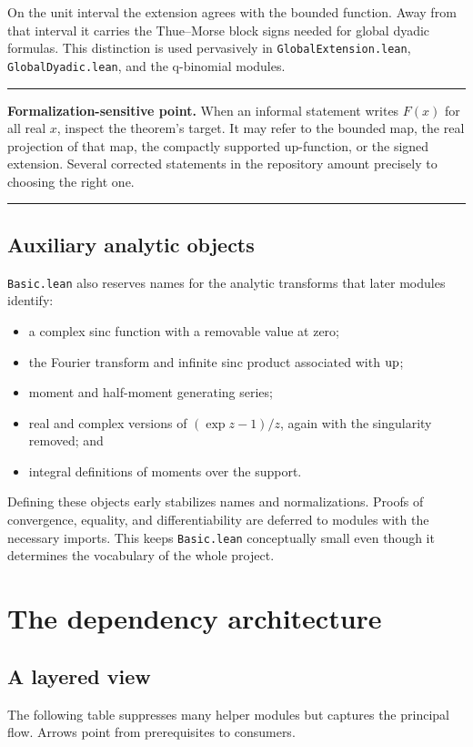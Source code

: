 \documentclass[11pt,oneside]{article}
\theoremstyle{definition}
\theoremstyle{remark}
\newenvironment{boxedremark}{%
  \par\smallskip\noindent\begin{center}\begin{minipage}{0.94\textwidth}%
  \color{black}\hrule\vspace{0.6em}\small
}{%
  \vspace{0.6em}\hrule\end{minipage}\end{center}\smallskip
}
\begin{document}
On the unit interval the extension agrees with the bounded function.  Away from that interval it carries the Thue--Morse block signs needed for global dyadic formulas.  This distinction is used pervasively in \nolinkurl{GlobalExtension.lean}, \nolinkurl{GlobalDyadic.lean}, and the q-binomial modules.

\begin{boxedremark}\textbf{Formalization-sensitive point.}\space
When an informal statement writes \(F(x)\) for all real \(x\), inspect the theorem's target.  It may refer to the bounded map, the real projection of that map, the compactly supported up-function, or the signed extension.  Several corrected statements in the repository amount precisely to choosing the right one.
\end{boxedremark}

\subsection{Auxiliary analytic objects}
\nolinkurl{Basic.lean} also reserves names for the analytic transforms that later modules identify:
\begin{itemize}
  \item a complex sinc function with a removable value at zero;
  \item the Fourier transform and infinite sinc product associated with \(\operatorname{up}\);
  \item moment and half-moment generating series;
  \item real and complex versions of \((\exp z-1)/z\), again with the singularity removed; and
  \item integral definitions of moments over the support.
\end{itemize}
Defining these objects early stabilizes names and normalizations.  Proofs of convergence, equality, and differentiability are deferred to modules with the necessary imports.  This keeps \nolinkurl{Basic.lean} conceptually small even though it determines the vocabulary of the whole project.

\section{The dependency architecture}\label{ch:architecture}

\subsection{A layered view}
The following table suppresses many helper modules but captures the principal flow.  Arrows point from prerequisites to consumers.
\end{document}
